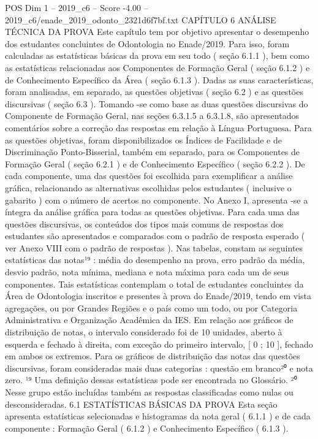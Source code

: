 \begin{textsample}{POS Dim 1 – 2019\_c6 – Score -4.00 – 2019\_c6/enade\_2019\_odonto\_2321d6f7bf.txt}  \label{ex:f1_pos_357}
CAPÍTULO 6 ANÁLISE TÉCNICA DA PROVA Este capítulo tem por objetivo apresentar o desempenho dos estudantes concluintes de Odontologia no Enade/2019.
Para isso, foram calculadas as estatísticas básicas da prova em seu todo ( seção 6.1.1 ), bem como as estatísticas relacionadas aos Componentes de Formação Geral ( seção 6.1.2 ) e de Conhecimento Específico da Área ( seção 6.1.3 ).
Dadas as suas características, foram analisadas, em separado, as questões objetivas ( seção 6.2 ) e as questões discursivas ( seção 6.3 ).
Tomando -se como base as duas questões discursivas do Componente de Formação Geral, nas seções 6.3.1.5 a 6.3.1.8, são apresentados comentários sobre a correção das respostas em relação à Língua Portuguesa.
Para as questões objetivas, foram disponibilizados os Índices de Facilidade e de Discriminação Ponto-Bisserial, também em separado, para os Componentes de Formação Geral ( seção 6.2.1 ) e de Conhecimento Específico ( seção 6.2.2 ).
De cada componente, uma das questões foi escolhida para exemplificar a análise gráfica, relacionando as alternativas escolhidas pelos estudantes ( inclusive o gabarito ) com o número de acertos no componente.
No Anexo I, apresenta -se a íntegra da análise gráfica para todas as questões objetivas.
Para cada uma das questões discursivas, os conteúdos dos tipos mais comuns de respostas dos estudantes são apresentados e comparados com o padrão de resposta esperado ( ver Anexo VIII com o padrão de respostas ).
Nas tabelas, constam as seguintes estatísticas das notas¹⁹ : média do desempenho na prova, erro padrão da média, desvio padrão, nota mínima, mediana e nota máxima para cada um de seus componentes.
Tais estatísticas contemplam o total de estudantes concluintes da Área de Odontologia inscritos e presentes à prova do Enade/2019, tendo em vista agregações, ou por Grandes Regiões e o país como um todo, ou por Categoria Administrativa e Organização Acadêmica da IES.
Em relação aos gráficos de distribuição de notas, o intervalo considerado foi de 10 unidades, aberto à esquerda e fechado à direita, com exceção do primeiro intervalo, [ 0 ; 10 ], fechado em ambos os extremos.
Para os gráficos de distribuição das notas das questões discursivas, foram consideradas mais duas categorias : questão em branco²⁰ e nota zero. ¹⁹ Uma definição dessas estatísticas pode ser encontrada no Glossário. ²⁰ Nesse grupo estão incluídas também as respostas classificadas como nulas ou desconsideradas. 6.1 ESTATÍSTICAS BÁSICAS DA PROVA Esta seção apresenta estatísticas selecionadas e histogramas da nota geral ( 6.1.1 ) e de cada componente : Formação Geral ( 6.1.2 ) e Conhecimento Específico ( 6.1.3 ).

\end{textsample}
